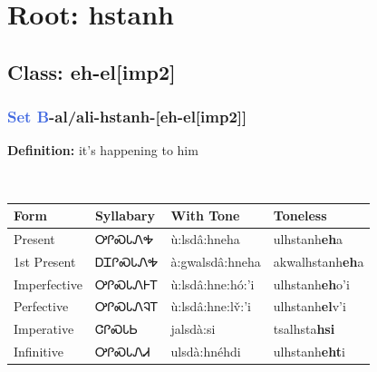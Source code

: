 \needspace{4in}
\section*{Root: hstanh}
\nopagebreak
{}
\needspace{3in}
\subsection*{Class: eh-el[imp2]}
\nopagebreak
\needspace{2in}
\subsubsection*{\textcolor{RoyalBlue}{Set B}{-}al/ali{-}\textbf{hstanh}{-}[eh-el[imp2]]}
\nopagebreak
\textbf{Definition: } it{\textquoteright}s happening to him
\\[0.5em]
\begin{tabularx}{\textwidth}{l X X X}%
\toprule%
\textbf{Form}&\textbf{Syllabary}&\textbf{With Tone}&\textbf{Toneless}\\%
\midrule%
Present&ᎤᎵᏍᏓᏁᎭ&ù:lsdâ:hneha&ulhstanh\textbf{eh}a\\%
1st Present&ᎠᏆᎵᏍᏓᏁᎭ&à:gwalsdâ:hneha&akwalhstanh\textbf{eh}a\\%
Imperfective&ᎤᎵᏍᏓᏁᎰᎢ&ù:lsdâ:hne:hó:’i&ulhstanh\textbf{eh}o'i\\%
Perfective&ᎤᎵᏍᏓᏁᎸᎢ&ù:lsdâ:hne:lv̌:’i&ulhstanh\textbf{el}v'i\\%
Imperative&ᏣᎵᏍᏓᏏ&jalsdà:si&tsalhsta\textbf{hsi}\\%
Infinitive&ᎤᎵᏍᏓᏁᏗ&ulsdà:hnéhdi&ulhstanh\textbf{eht}i\\%
\bottomrule%
\end{tabularx}
\\[1em]